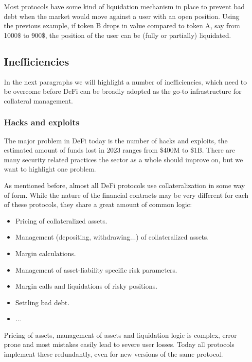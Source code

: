 \documentclass[sigconf,nonacm]{acmart}
\begin{document}
Most protocols have some kind of liquidation mechanism in place to prevent bad debt when the market would move against a user with an open position.
Using the previous example, if token B drops in value compared to token A, say from 1000\$ to 900\$,
the position of the user can be (fully or partially) liquidated.

\subsection{Inefficiencies}
\label{subsec:inefficiencies}

In the next paragraphs we will highlight a number of inefficiencies,
which need to be overcome before DeFi can be broadly adopted as the go-to infrastructure for collateral management.

\subsubsection{Hacks and exploits}
\label{subsubsec:hacks-and-exploits}

The major problem in DeFi today is the number of hacks and exploits, the estimated amount of funds lost in 2023 ranges from \$400M to \$1B.
There are many security related practices the sector as a whole should improve on, but we want to highlight one problem.

As mentioned before, almost all DeFi protocols use collateralization in some way of form.
While the nature of the financial contracts may be very different for each of these protocols, they share a great amount of common logic:
\begin{itemize}
    \item Pricing of collateralized assets.
    \item Management (depositing, withdrawing...) of collateralized assets.
    \item Margin calculations.
    \item Management of asset-liability specific risk parameters.
    \item Margin calls and liquidations of risky positions.
    \item Settling bad debt.
    \item ...
\end{itemize}

Pricing of assets, management of assets and liquidation logic is complex, error prone and most mistakes easily lead to severe user losses.
Today all protocols implement these redundantly, even for new versions of the same protocol.
\end{document}
